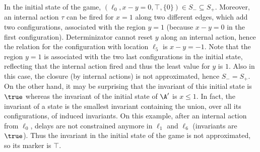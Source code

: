 \documentclass{LMCS}
\theoremstyle{plain}\newtheorem{proposition}[thm]{Proposition}
\begin{document}
\begin{exa}
In the initial state of the game, $(\ell_0,x-y=0,\top,\{0\})\in S_-
\subseteq S_+$. Moreover, an internal action $\tau$ can be fired for
$x=1$ along two different edges, which add two configurations,
associated with the region $y=1$ (because $x-y=0$ in the first
configuration). Determinizator cannot reset $y$ along an internal
action, hence the relation for the configuration with location
$\ell_5$ is $x-y=-1$. Note that the region $y=1$ is associated with
the two last configurations in the initial state, reflecting that the
internal action fired and thus the least value for $y$ is $1$.  Also
in this case, the closure (by internal actions) is not approximated,
hence $S_-=S_+$.  
On the other hand, it may be surprising that the invariant of this
initial state is $\true$ whereas the invariant of the initial state of
$\A'$ is $x\le1$.  In fact, the invariant of a state is the smallest
invariant containing the union, over all its configurations, of induced
invariants.  On this example, after an internal action from $\ell_0$,
delays are not constrained anymore in $\ell_1$ and $\ell_6$
(invariants are $\true$).  Thus the invariant in the initial state of
the game is not approximated, so its marker is $\top$.



\end{exa}
\end{document}
